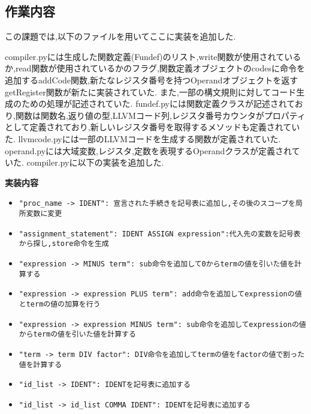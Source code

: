 \documentclass[main]{subfiles}
\begin{document}
\subsection{作業内容}
この課題では,以下のファイルを用いてここに実装を追加した.




% 
compiler.pyには生成した関数定義(Fundef)のリスト,write関数が使用されているか,read関数が使用されているかのフラグ,関数定義オブジェクトのcodesに命令を追加するaddCode関数,新たなレジスタ番号を持つOperandオブジェクトを返すgetRegister関数が新たに実装されていた.
また,一部の構文規則に対してコード生成のための処理が記述されていた.
fundef.pyには関数定義クラスが記述されており,関数は関数名,返り値の型,LLVMコード列,レジスタ番号カウンタがプロパティとして定義されており,新しいレジスタ番号を取得するメソッドも定義されていた.
llvmcode.pyには一部のLLVMコードを生成する関数が定義されていた.
operand.pyには大域変数,レジスタ,定数を表現するOperandクラスが定義されていた.
compiler.pyに以下の実装を追加した.
\begin{oframed}
\textbf{実装内容}
\begin{itemize}
    \item \verb|"proc_name -> IDENT": 宣言された手続きを記号表に追加し,その後のスコープを局所変数に変更|
    \item \verb|"assignment_statement": IDENT ASSIGN expression":代入先の変数を記号表から探し,store命令を生成|
    \item \verb|"expression -> MINUS term": sub命令を追加して0からtermの値を引いた値を計算する|
    \item \verb|"expression -> expression PLUS term": add命令を追加してexpressionの値とtermの値の加算を行う|
    \item \verb|"expression -> expression MINUS term": sub命令を追加してexpressionの値からtermの値を引いた値を計算する|
    \item \verb|"term -> term DIV factor": DIV命令を追加してtermの値をfactorの値で割った値を計算する|
    \item \verb|"id_list -> IDENT": IDENTを記号表に追加する|
    \item \verb|"id_list -> id_list COMMA IDENT": IDENTを記号表に追加する|
\end{itemize}
\end{oframed}
\end{document}
